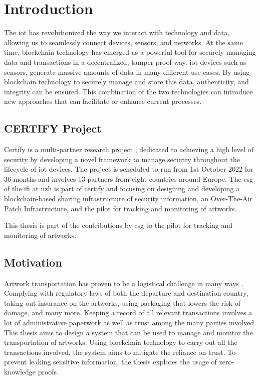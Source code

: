 \chapter{Introduction}
The \gls{iot} has revolutionized the way we interact with technology and data, allowing us to seamlessly connect devices, sensors, and networks. At the same time, blockchain technology has emerged as a powerful tool for securely managing data and transactions in a decentralized, tamper-proof way. \gls{iot} devices such as sensors, generate massive amounts of data in many different use cases. By using blockchain technology to securely manage and store this data, authenticity, and integrity can be ensured. This combination of the two technologies can introduce new approaches that can facilitate or enhance current processes.

\section{CERTIFY Project}
\label{sec:certify}
Certify is a multi-partner research project \cite{certify}, dedicated to achieving a high level of security by developing a novel framework to manage security throughout the lifecycle of \gls{iot} devices. The project is scheduled to run from 1st October 2022 for 36 months and involves 13 partners from eight countries around Europe. The \gls{csg} of the \gls{ifi} at \gls{uzh} is part of certify and focusing on designing and developing a blockchain-based sharing infrastructure of security information, an Over-The-Air Patch Infrastructure, and the pilot for tracking and monitoring of artworks.

This thesis is part of the contributions by \gls{csg} to the pilot for tracking and monitoring of artworks.

\section{Motivation}
Artwork transportation has proven to be a logistical challenge in many ways \cite{artintransit}. Complying with regulatory laws of both the departure and destination country, taking out insurance on the artworks, using packaging that lowers the risk of damage, and many more. Keeping a record of all relevant transactions involves a lot of administrative paperwork as well as trust among the many parties involved. This thesis aims to design a system that can be used to manage and monitor the transportation of artworks. Using blockchain technology to carry out all the transactions involved, the system aims to mitigate the reliance on trust. To prevent leaking sensitive information, the thesis explores the usage of zero-knowledge proofs.

